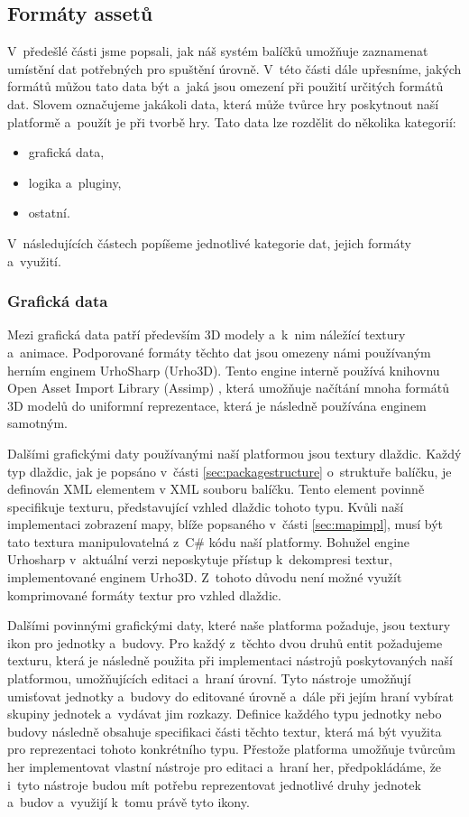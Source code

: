 \subsection{Formáty assetů}
V~předešlé části jsme popsali, jak náš systém balíčků umožňuje zaznamenat umístění dat potřebných pro spuštění úrovně. V~této části dále upřesníme, jakých formátů můžou tato data být a~jaká jsou omezení při použití určitých formátů dat. Slovem \textit{ } označujeme jakákoli data, která může tvůrce hry poskytnout naší platformě a~použít je při tvorbě hry. Tato data lze rozdělit do několika kategorií:
\begin{itemize}
	\item grafická data,
	\item logika a~pluginy,
	\item ostatní.
\end{itemize}

V~následujících částech popíšeme jednotlivé kategorie dat, jejich formáty a~využití.

\subsubsection{Grafická data}
Mezi grafická data patří především 3D modely a~k~nim náležící textury a~animace. Podporované formáty těchto dat jsou omezeny námi používaným herním enginem UrhoSharp (Urho3D). Tento engine interně používá knihovnu Open Asset Import Library (Assimp) \citep{site:assimp}, která umožňuje načítání mnoha formátů 3D modelů do uniformní reprezentace, která je následně používána enginem samotným.

Dalšími grafickými daty používanými naší platformou jsou textury dlaždic. Každý typ dlaždic, jak je popsáno v~části \ref{sec:packagestructure} o~struktuře balíčku, je definován XML elementem v XML souboru balíčku. Tento element povinně specifikuje texturu, představující vzhled dlaždic tohoto typu. Kvůli naší implementaci zobrazení mapy, blíže popsaného v~části \ref{sec:mapimpl}, musí být tato textura manipulovatelná z~C\# kódu naší platformy. Bohužel engine Urhosharp v~aktuální verzi neposkytuje přístup k~dekompresi textur, implementované enginem Urho3D. Z~tohoto důvodu není možné využít komprimované formáty textur pro vzhled dlaždic.

Dalšími povinnými grafickými daty, které naše platforma požaduje, jsou textury ikon pro jednotky a~budovy. Pro každý z~těchto dvou druhů entit požadujeme texturu, která je následně použita při implementaci nástrojů  poskytovaných naší platformou, umožňujících editaci a~hraní úrovní. Tyto nástroje umožňují umisťovat jednotky a~budovy do editované úrovně a~dále při jejím hraní vybírat skupiny jednotek a~vydávat jim rozkazy. Definice každého typu jednotky nebo budovy následně obsahuje specifikaci části těchto textur, která má být využita pro reprezentaci tohoto konkrétního typu. Přestože platforma umožňuje tvůrcům her implementovat vlastní nástroje pro editaci a~hraní her, předpokládáme, že i~tyto nástroje budou mít potřebu reprezentovat jednotlivé druhy jednotek a~budov a~využijí k~tomu právě tyto ikony.

